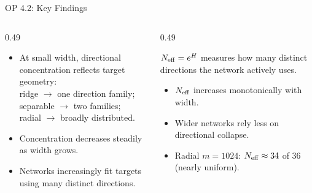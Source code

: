\documentclass[aspectratio=169, 10pt]{beamer}
\begin{document}
\begin{frame}{OP 4.2: Key Findings}
  \begin{columns}[T]
    \begin{column}{0.49\textwidth}
      \begin{tcolorbox}[slideboxC, title={What the data shows}]
        \small
        \begin{itemize}\setlength{\itemsep}{4pt}
          \item At small width, directional concentration
                reflects target geometry:\\
                ridge $\to$ one direction family;\\
                separable $\to$ two families;\\
                radial $\to$ broadly distributed.
          \item Concentration decreases steadily
                as width grows.
          \item Networks increasingly fit targets
                using many distinct directions.
        \end{itemize}
      \end{tcolorbox}
    \end{column}
    \begin{column}{0.49\textwidth}
      \begin{tcolorbox}[slideboxA, title={Effective directional complexity}]
        \small
        $N_{\rm eff} = e^H$ measures how many distinct
        directions the network actively uses.
        \vspace{5pt}
        \begin{itemize}\setlength{\itemsep}{4pt}
          \item $N_{\rm eff}$ increases monotonically with width.
          \item Wider networks rely less on directional collapse.
          \item Radial $m{=}1024$: $N_{\rm eff} \approx 34$
                of 36 (nearly uniform).
        \end{itemize}
      \end{tcolorbox}
    \end{column}
  \end{columns}
\end{frame}
\end{document}
